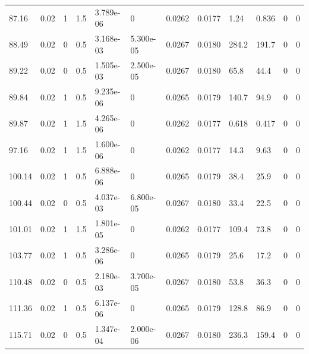 \documentclass[preview]{standalone}
\begin{document}
{{\begin{tabular}{L{1.2cm}C{1.2cm} C{0.3cm}C{0.5cm} C{1.4cm}C{1.4cm} C{1.4cm}C{1.4cm} C{1.6cm}C{1.6cm} C{1.6cm}C{1.6cm}}
  87.16  &  0.02  & 1     & 1.5 &  3.789e-06  & 0  &  0.0262&   0.0177& 1.24 & 0.836   &  0 & 0  \\ 
  88.49  &  0.02  & 0     & 0.5 &  3.168e-03  & 5.300e-05  &  0.0267&   0.0180& 284.2 & 191.7   &  0 & 0  \\ 
  89.22  &  0.02  & 0     & 0.5 &  1.505e-03  & 2.500e-05  &  0.0267&   0.0180& 65.8 & 44.4   &  0 & 0  \\ 
  89.84  &  0.02  & 1     & 0.5 &  9.235e-06  & 0  &  0.0265&   0.0179& 140.7 & 94.9   &  0 & 0  \\ 
  89.87  &  0.02  & 1     & 1.5 &  4.265e-06  & 0  &  0.0262&   0.0177& 0.618 & 0.417   &  0 & 0  \\ 
  97.16  &  0.02  & 1     & 1.5 &  1.600e-06  & 0  &  0.0262&   0.0177& 14.3 & 9.63   &  0 & 0  \\ 
  100.14  &  0.02  & 1     & 0.5 &  6.888e-06  & 0  &  0.0265&   0.0179& 38.4 & 25.9   &  0 & 0  \\ 
  100.44  &  0.02  & 0     & 0.5 &  4.037e-03  & 6.800e-05  &  0.0267&   0.0180& 33.4 & 22.5   &  0 & 0  \\ 
  101.01  &  0.02  & 1     & 1.5 &  1.801e-05  & 0  &  0.0262&   0.0177& 109.4 & 73.8   &  0 & 0  \\ 
  103.77  &  0.02  & 1     & 0.5 &  3.286e-06  & 0  &  0.0265&   0.0179& 25.6 & 17.2   &  0 & 0  \\ 
  110.48  &  0.02  & 0     & 0.5 &  2.180e-03  & 3.700e-05  &  0.0267&   0.0180& 53.8 & 36.3   &  0 & 0  \\ 
  111.36  &  0.02  & 1     & 0.5 &  6.137e-06  & 0  &  0.0265&   0.0179& 128.8 & 86.9   &  0 & 0  \\ 
  115.71  &  0.02  & 0     & 0.5 &  1.347e-04  & 2.000e-06  &  0.0267&   0.0180& 236.3 & 159.4   &  0 & 0  \\ 
\hline 
\end{tabular} 

}}
\end{document}
